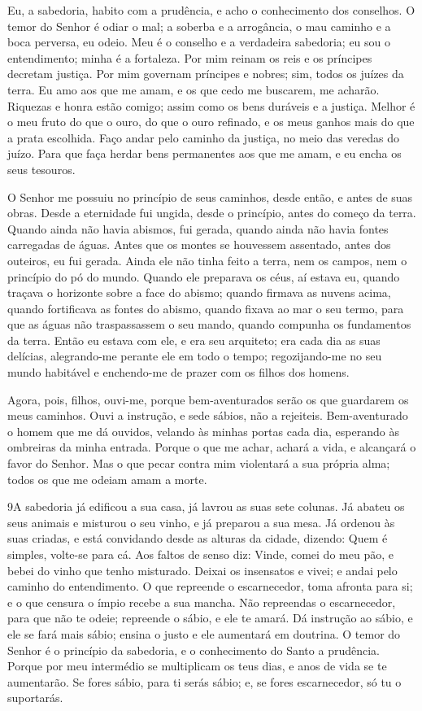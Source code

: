 Eu, a sabedoria, habito com a prudência, e acho o conhecimento
dos conselhos. O temor do Senhor é odiar o mal; a soberba e a
arrogância, o mau caminho e a boca perversa, eu odeio. Meu é
o conselho e a verdadeira sabedoria; eu sou o entendimento; minha é
a fortaleza. Por mim reinam os reis e os príncipes decretam
justiça. Por mim governam príncipes e nobres; sim, todos os
juízes da terra.
 Eu amo aos que me amam, e os que cedo me buscarem, me acharão. Riquezas e honra estão comigo; assim como os bens duráveis e a
justiça. Melhor é o meu fruto do que o ouro, do que o ouro
refinado, e os meus ganhos mais do que a prata escolhida.
Faço andar pelo caminho da justiça, no meio das veredas do
juízo. Para que faça herdar bens permanentes aos que me amam,
e eu encha os seus tesouros.

O Senhor me possuiu no princípio de seus caminhos, desde então, e
antes de suas obras. Desde a eternidade fui ungida, desde o
princípio, antes do começo da terra. Quando ainda não havia
abismos, fui gerada, quando ainda não havia fontes carregadas de
águas. Antes que os montes se houvessem assentado, antes dos
outeiros, eu fui gerada. Ainda ele não tinha feito a terra,
nem os campos, nem o princípio do pó do mundo. Quando ele
preparava os céus, aí estava eu, quando traçava o horizonte sobre a
face do abismo; quando firmava as nuvens acima, quando
fortificava as fontes do abismo, quando fixava ao mar o seu
termo, para que as águas não traspassassem o seu mando, quando
compunha os fundamentos da terra. Então eu estava com ele, e
era seu arquiteto; era cada dia as suas delícias, alegrando-me
perante ele em todo o tempo; regozijando-me no seu mundo
habitável e enchendo-me de prazer com os filhos dos homens.

Agora, pois, filhos, ouvi-me, porque bem-aventurados serão os que
guardarem os meus caminhos. Ouvi a instrução, e sede sábios,
não a rejeiteis. Bem-aventurado o homem que me dá ouvidos,
velando às minhas portas cada dia, esperando às ombreiras da minha
entrada. Porque o que me achar, achará a vida, e alcançará o
favor do Senhor. Mas o que pecar contra mim violentará a sua
própria alma; todos os que me odeiam amam a morte.

\medskip

\lettrine{9}{}A sabedoria já edificou a sua casa, já lavrou as
suas sete colunas. Já abateu os seus animais e misturou o seu
vinho, e já preparou a sua mesa. Já ordenou às suas criadas, e
está convidando desde as alturas da cidade, dizendo: Quem é
simples, volte-se para cá. Aos faltos de senso diz: Vinde, comei
do meu pão, e bebei do vinho que tenho misturado. Deixai os
insensatos e vivei; e andai pelo caminho do entendimento. O que
repreende o escarnecedor, toma afronta para si; e o que censura o
ímpio recebe a sua mancha. Não repreendas o escarnecedor, para
que não te odeie; repreende o sábio, e ele te amará. Dá
instrução ao sábio, e ele se fará mais sábio; ensina o justo e ele
aumentará em doutrina. O temor do Senhor é o princípio da
sabedoria, e o conhecimento do Santo a prudência. Porque por
meu intermédio se multiplicam os teus dias, e anos de vida se te
aumentarão. Se fores sábio, para ti serás sábio; e, se fores
escarnecedor, só tu o suportarás.

